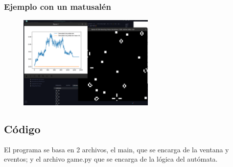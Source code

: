 \documentclass[10pt]{article}
\begin{document}
                \subsubsection{Ejemplo con un matusalén}
                \begin{figure}[h!]
                    \centering
                    \includegraphics[width=0.6\textwidth]{grafica.png}
                \end{figure}
                \newpage
        \subsection{Código}
            El programa se basa en 2 archivos, el main, que se encarga de la ventana y eventos; y el archivo game.py que se encarga de la lógica del autómata.
\end{document}
